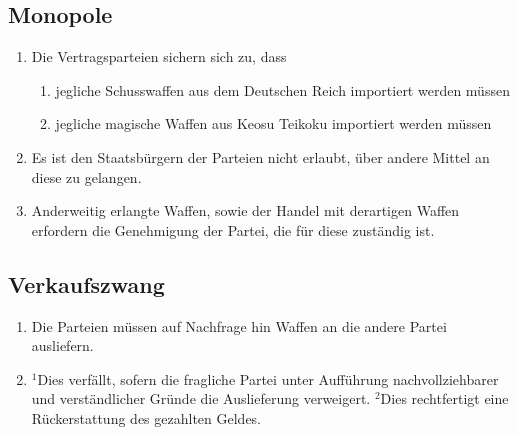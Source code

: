 \documentclass{article}
\begin{document}
\subsection{Monopole}
\begin{enumerate}[(1)]
    \item Die Vertragsparteien sichern sich zu, dass
    \begin{enumerate}[1.]
        \item jegliche Schusswaffen aus dem Deutschen Reich importiert werden müssen
        \item jegliche magische Waffen aus Keosu Teikoku importiert werden müssen
    \end{enumerate}
    \item Es ist den Staatsbürgern der Parteien nicht erlaubt, über andere Mittel an diese zu gelangen.
    \item Anderweitig erlangte Waffen, sowie der Handel mit derartigen Waffen erfordern die Genehmigung der Partei, die für diese zuständig ist.
\end{enumerate}

\subsection{Verkaufszwang}
\begin{enumerate}[(1)]
    \item Die Parteien müssen auf Nachfrage hin Waffen an die andere Partei ausliefern.
    \item ${^1}$Dies verfällt, sofern die fragliche Partei unter Aufführung nachvollziehbarer und verständlicher Gründe die Auslieferung verweigert. ${^2}$Dies rechtfertigt eine Rückerstattung des gezahlten Geldes.
\end{enumerate}
\end{document}
